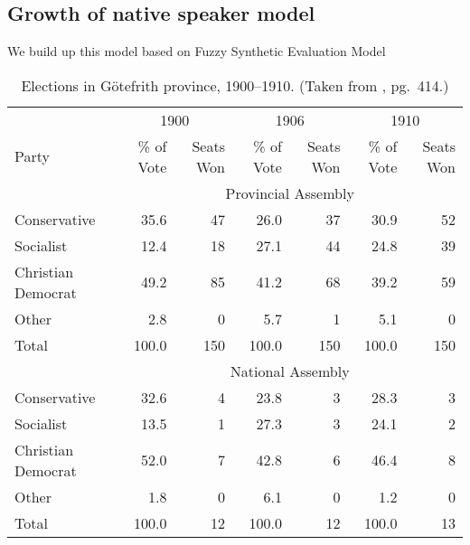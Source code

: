\documentclass{mcmthesis}
\begin{document}
\subsection{Growth of native speaker model}
\qquad We build up this model based on Fuzzy Synthetic Evaluation Model
\begin{table}
\begin{center}
{\hspace{-2in}
\begin{minipage}{\textwidth}
\fontsize{10}{12}\selectfont
\begin{tabular}[c]{lrrrrrr}
\toprule
              & \multicolumn{2}{c}{1900} & \multicolumn{2}{c}{1906} & \multicolumn{2}{c}{1910}\\
\cmidrule(r){2-3}\cmidrule(lr){4-5}\cmidrule(l){6-7}
Party         & \% of Vote  & Seats Won  & \% of Vote  & Seats Won  & \% of Vote  & Seats Won \\
\midrule
\addlinespace
              & \multicolumn{6}{c}{Provincial Assembly}\\
\cmidrule{2-7}
Conservative  & 35.6        &  47        & 26.0        & 37         & 30.9        & 52\\
Socialist     & 12.4        &  18        & 27.1        & 44         & 24.8        & 39\\
Christian Democrat & 49.2   &  85        & 41.2        & 68         & 39.2        & 59\\
Other         & 2.8         &  0         & 5.7         & 1          & 5.1         & 0\\
\addlinespace
Total& 100.0       &  150       & 100.0       & 150        & 100.0       & 150\\
\addlinespace
              & \multicolumn{6}{c}{National Assembly}\\
\cmidrule{2-7}
Conservative  & 32.6        &   4        & 23.8        &  3         & 28.3        & 3\\
Socialist     & 13.5        &   1        & 27.3        &  3         & 24.1        & 2\\
Christian Democrat & 52.0   &   7        & 42.8        &  6         & 46.4        & 8\\
Other         & 1.8         &   0        & 6.1         &  0         & 1.2         & 0\\
\addlinespace
Total& 100.0       &  12        & 100.0       & 12         & 100.0       & 13\\
\bottomrule
\end{tabular}
\end{minipage}
}
\caption[Elections in G\"{o}tefrith province, 1900--1910]{Elections in
  G\"{o}tefrith province, 1900--1910.  (Taken from \cite{chicago},
  pg.~414.)}%
\label{tab:chicago-table}
\end{center}
\end{table}
\end{document}
